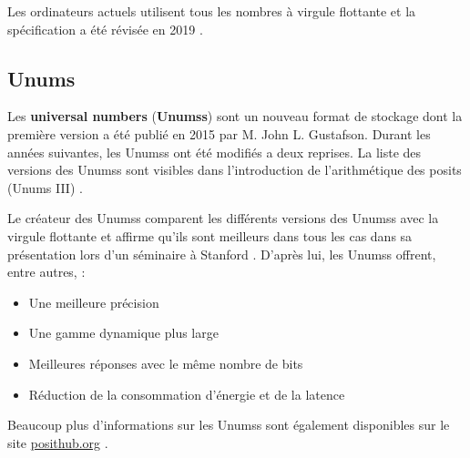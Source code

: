 Les ordinateurs actuels utilisent tous les nombres à virgule flottante et la spécification a été révisée en 2019 \cite{ieee-754-2019}.

\subsection{Unums}

Les \textbf{universal numbers} (\textbf{\glspl{Unums}}) sont un nouveau format de stockage dont la première version a été publié en 2015 par M. John L. Gustafson. Durant les années suivantes, les \glspl{Unums} ont été modifiés a deux reprises. La liste des versions des \glspl{Unums} sont visibles dans l'introduction de l'arithmétique des posits (\gls{Unums} III) \cite{posit-arithmetic}.

Le créateur des \glspl{Unums} comparent les différents versions des \glspl{Unums} avec la virgule flottante et affirme qu'ils sont meilleurs dans tous les cas dans sa présentation lors d'un séminaire à Stanford \cite{youtube-beyond-floating-point}. D'après lui, les \glspl{Unums} offrent, entre autres, :

\begin{itemize}
    \item Une meilleure précision
    \item Une gamme dynamique plus large
    \item Meilleures réponses avec le même nombre de bits
    \item Réduction de la consommation d'énergie et de la latence
\end{itemize}

Beaucoup plus d'informations sur les \glspl{Unums} sont également disponibles sur le site \url{posithub.org} \cite{posithub}.

